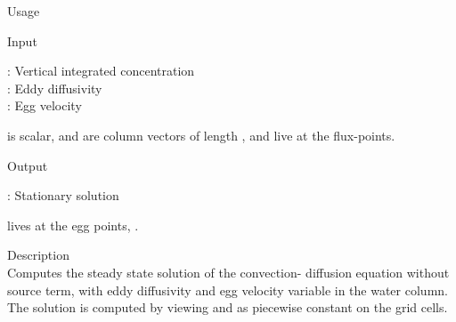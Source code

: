 {

\begin{tdesc}
\item[Usage] 
\item[Input]
  \begin{vartab}
   \>  : \> Vertical integrated concentration \> [eggs/m$^2$] \\
   \>  : \> Eddy diffusivity \> [\sqmps] \\
   \>  : \> Egg velocity   \>  [\mps]
  \end{vartab}
   is scalar,  and  are column vectors of
  length ,  and  live at the flux-points.
\item[Output]
  \begin{vartab}
      \>  : \> Stationary solution \> [eggs/m$^3$]
  \end{vartab}
   lives at the egg points, .
\item[Description]\mbox{}\\
  Computes the steady state solution of the convection-
  diffusion equation without source term, with eddy diffusivity 
   and egg
  velocity  variable in the water column. 
  The solution is computed by viewing  and 
  as piecewise constant on the grid cells.
\end{tdesc}



}
